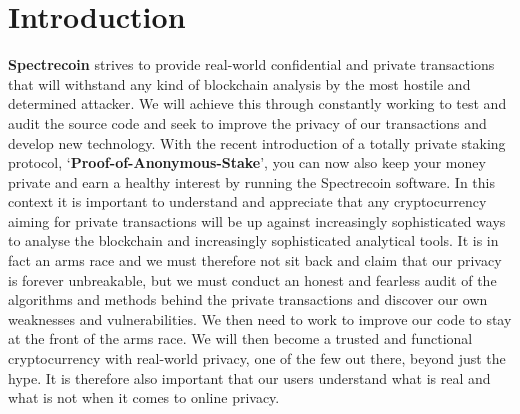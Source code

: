 \section{Introduction}
\textbf{Spectrecoin} strives to provide real-world confidential and private
transactions that will withstand any kind of blockchain analysis by
the most hostile and determined attacker. We will achieve this through
constantly working to test and audit the source code and seek to improve
the privacy of our transactions and develop new technology. With the
recent introduction of a totally private staking protocol,
‘\textbf{Proof-of-Anonymous-Stake}’, you can now also keep your money private and
earn a healthy interest by running the Spectrecoin software. In this
context it is important to understand and appreciate that any cryptocurrency
aiming for private transactions will be up against increasingly sophisticated
ways to analyse the blockchain and increasingly sophisticated analytical tools.
It is in fact an arms race and we must therefore not sit back and claim that
our privacy is forever unbreakable, but we must conduct an honest and
fearless audit of the algorithms and methods behind the private transactions
and discover our own weaknesses and vulnerabilities. We then need to work to
improve our code to stay at the front of the arms race. We will then become
a trusted and functional cryptocurrency with real-world privacy, one of the
few out there, beyond just the hype. It is therefore also important that our
users understand what is real and what is not when it comes to online privacy.
